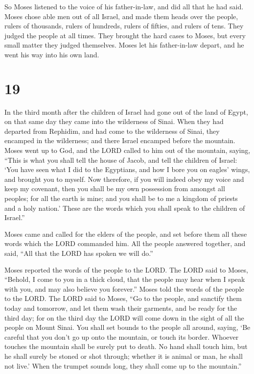  So Moses listened to the voice of his father-in-law, and
did all that he had said.  Moses chose able men out of
all Israel, and made them heads over the people, rulers of thousands,
rulers of hundreds, rulers of fifties, and rulers of tens.
 They judged the people at all times. They brought the
hard cases to Moses, but every small matter they judged themselves.
 Moses let his father-in-law depart, and he went his way
into his own land.

\hypertarget{section-18}{%
\section{19}\label{section-18}}

 In the third month after the children of Israel had gone
out of the land of Egypt, on that same day they came into the wilderness
of Sinai.  When they had departed from Rephidim, and had
come to the wilderness of Sinai, they encamped in the wilderness; and
there Israel encamped before the mountain.  Moses went up
to God, and the LORD called to him out of the mountain, saying, ``This
is what you shall tell the house of Jacob, and tell the children of
Israel:  `You have seen what I did to the Egyptians, and
how I bore you on eagles' wings, and brought you to myself.
 Now therefore, if you will indeed obey my voice and keep
my covenant, then you shall be my own possession from amongst all
peoples; for all the earth is mine;  and you shall be to
me a kingdom of priests and a holy nation.' These are the words which
you shall speak to the children of Israel.''

 Moses came and called for the elders of the people, and
set before them all these words which the LORD commanded him.
 All the people answered together, and said, ``All that
the LORD has spoken we will do.''

Moses reported the words of the people to the LORD.  The
LORD said to Moses, ``Behold, I come to you in a thick cloud, that the
people may hear when I speak with you, and may also believe you
forever.'' Moses told the words of the people to the LORD.
 The LORD said to Moses, ``Go to the people, and sanctify
them today and tomorrow, and let them wash their garments,
 and be ready for the third day; for on the third day the
LORD will come down in the sight of all the people on Mount Sinai.
 You shall set bounds to the people all around, saying,
`Be careful that you don't go up onto the mountain, or touch its border.
Whoever touches the mountain shall be surely put to death.
 No hand shall touch him, but he shall surely be stoned
or shot through; whether it is animal or man, he shall not live.' When
the trumpet sounds long, they shall come up to the mountain.''

